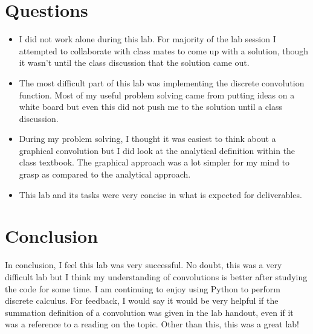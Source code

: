 \documentclass[12pt]{report}
\begin{document}
\section{Questions}
\begin{itemize}
  \item I did not work alone during this lab. For majority of the lab session I attempted to collaborate with class mates to come up with a solution, though it wasn't
  until the class discussion that the solution came out.
  \item The most difficult part of this lab was implementing the discrete convolution function. Most of my useful problem solving came from putting ideas on a white board
  but even this did not push me to the solution until a class discussion.
  \item During my problem solving, I thought it was easiest to think about a graphical convolution but I did look at the analytical definition within the class textbook.
  The graphical approach was a lot simpler for my mind to grasp as compared to the analytical approach.
  \item This lab and its tasks were very concise in what is expected for deliverables.
\end{itemize}
\section{Conclusion}
In conclusion, I feel this lab was very successful. No doubt, this was a very difficult lab but I think my understanding of convolutions is better after studying the code
for some time. I am continuing to enjoy using Python to perform discrete calculus. For feedback, I would say it would be very helpful if the summation definition of a
convolution was given in the lab handout, even if it was a reference to a reading on the topic. Other than this, this was a great lab!
\newpage

\end{document}
